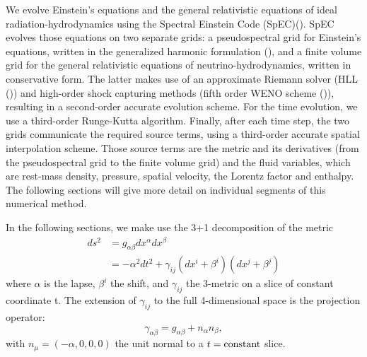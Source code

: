We evolve Einstein's equations and the general relativistic equations of ideal radiation-hydrodynamics using the Spectral Einstein Code (SpEC)(\citet*{specwebsite}). SpEC evolves those equations on
two separate grids: a pseudospectral grid for Einstein's equations, written in the generalized harmonic formulation (\citet*{lindblom2006}),
and a finite volume grid for the general relativistic equations
of neutrino-hydrodynamics, written in conservative form. The latter
makes use of an approximate Riemann solver (HLL (\citet*{hll}))
and high-order shock capturing methods (fifth order WENO
scheme (\citet*{liu1994200,jiang1996202})), resulting in a second-order accurate evolution scheme. For the time evolution, we use a third-order
Runge-Kutta algorithm. Finally, after each time step, the two
grids communicate the required source terms, using a third-order accurate spatial interpolation scheme. Those source terms are the metric and its derivatives (from the pseudospectral grid to the finite volume grid) and the fluid variables, which are rest-mass density, pressure, spatial velocity, the Lorentz factor and enthalpy. The following sections will give more detail on individual segments of this numerical method.

In the following sections, we make use the 3+1 decomposition of the metric
%
\begin{align}
  ds^2 &= g_{\alpha\beta}dx^\alpha dx^\beta \\
  &= -\alpha^2dt^2 + \gamma_{ij}(dx^i + \beta^i)(dx^j + \beta^j)
\end{align}
%
where $\alpha$ is the lapse, $\beta^i$ the shift, and $\gamma_{ij}$ the 3-metric on a slice of constant coordinate t. The extension of $\gamma_{ij}$ to the full 4-dimensional space is the projection operator:
%
\begin{equation}
  \gamma_{\alpha\beta} = g_{\alpha\beta} + n_\alpha n_\beta,
\end{equation}
with $n_\mu=(-\alpha,0,0,0)$ the unit normal to a $t={\rm constant}$ slice.
%


